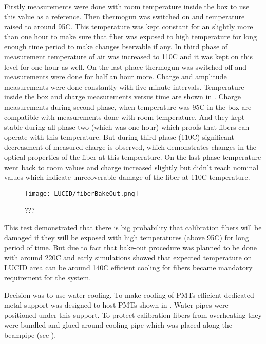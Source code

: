 Firstly measurements were done with room temperature inside the box to use this value as a reference.
Then thermogun was switched on and temperature raised to around 95\degree C.
This temperature was kept constant for an slightly more than one hour to make sure that fiber was exposed to high temperature for
long enough time period to make changes bservable if any. 
In third phase of measurement temperature of air was increased to 110\degree C and it was kept on this level for one hour as well.
On the last phace thermogun was switched off and measurements were done for half an hour more.
Charge and amplitude measurements were done constantly with five-minute intervals. 
Temperature inside the box and charge measurements versus time are shown in .
Charge measurements during second phase, when temperature was 95\degree C in the box are compatible with measurements done with room temperature.
And they kept stable during all phase two (which was one hour) which proofs that fibers can operate with this temperature.
But during third phase (110\degree C) significant decreasment of measured charge is observed, which demonstrates changes in the
optical properties of the fiber at this temperature. On the last phase temperature went back to room values and charge increased slightly but didn't reach 
nominal values which indicate unrecoverable damage of the fiber at 110\degree C temperature.

\begin{figure}
\centering
\texttt{[image: LUCID/fiberBakeOut.png]}
\caption{???}
\label{fig:fiberBakeOut}
\end{figure}

This test demonstrated that there is big probability that calibration fibers will be damaged if they will be exposed 
with high temperatures (above 95\degree C) for long period of time.
But due to fact that bake-out procedure was planned to be done with around 220\degree C and early
simulations showed that expected temperature on LUCID area can be around 140\degree C 
efficient cooling for fibers became mandatory requirement for the system.

Decision was to use water cooling. 
To make cooling of PMTs efficient dedicated metal support was designed to host PMTs shown in .
Water pipes were positioned under this support.
To protect calibration fibers from overheating they were bundled and glued around cooling pipe which was placed along 
the beampipe (see ).


